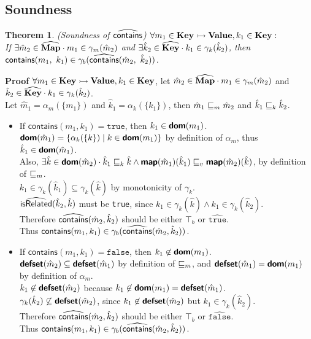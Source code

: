 \subsection{Soundness} \label{sec:soundness}
\newtheorem{thm}{Theorem}
\begin{thm} \normalfont
(\textit{Soundness of} $\widehat{\textsf{contains}}$)
$\forall m_1 \in \textbf{Key} \rightarrowtail \textbf{Value}, k_1 \in \textbf{Key} :$\\
If $\exists \hat{m}_2 \in \widehat{\textbf{Map}} \cdot m_1 \in \gamma_m(\hat{m}_2)$
and $\exists \hat{k}_2 \in \widehat{\textbf{Key}} \cdot k_1 \in \gamma_k(\hat{k}_2)$,
then $\textsf{contains}(m_1,\ k_1) \in \gamma_b(\widehat{\textsf{contains}}(\hat{m}_2,\ \hat{k}_2))$.
\end{thm}
\textbf{Proof } $\forall m_1 \in \textbf{Key} \rightarrowtail \textbf{Value}, k_1 \in \textbf{Key}$, 
let $\hat{m}_2 \in \widehat{\textbf{Map}} \cdot m_1 \in \gamma_m(\hat{m}_2)$ 
and $\hat{k}_2 \in \widehat{\textbf{Key}} \cdot k_1 \in \gamma_k(\hat{k}_2)$.\\
Let $\hat{m}_1 = \alpha_m(\{ m_1 \})$ and $\hat{k}_1 = \alpha_k(\{ k_1 \})$,
then $\hat{m}_1 \sqsubseteq_m \hat{m}_2$ and $\hat{k}_1 \sqsubseteq_k \hat{k}_2$.
\begin{itemize}
\item If $\textsf{contains}(m_1, k_1) = \texttt{true}$, then $k_1 \in \textsf{\textbf{dom}}(m_1)$.\\
$\textsf{\textbf{dom}}(\hat{m}_1)  = \{ \alpha_k(\{k\}) \mid k \in \textsf{\textbf{dom}}(m_1) \}$
by definition of $\alpha_m$, thus $\hat{k}_1 \in \textsf{\textbf{dom}}(\hat{m}_1)$.\\
Also, $\exists \hat{k} \in \textsf{\textbf{dom}}(\hat{m}_2) 
\cdot \hat{k}_1 \sqsubseteq_k \hat{k} \land \textsf{\textbf{map}}(\hat{m}_1)(\hat{k}_1) \sqsubseteq_v \textsf{\textbf{map}}(\hat{m}_2)(\hat{k})$,
by definition of $\sqsubseteq_m$.\\
$k_1 \in \gamma_k(\hat{k}_1) \subseteq \gamma_k(\hat{k})$ by monotonicity of $\gamma_k$.\\ 
$\widehat{\textsf{isRelated}}(\hat{k}_2, \hat{k})$ must be \texttt{true},
since $k_1 \in \gamma_k(\hat{k}) \land k_1 \in \gamma_k(\hat{k}_2)$. \\
Therefore $\widehat{\textsf{contains}}(\hat{m}_2, \hat{k}_2)$ should be either $\top_b$ or $\hat{\texttt{true}}$.\\
Thus $\textsf{contains}(m_1, k_1) \in \gamma_b(\widehat{\textsf{contains}}(\hat{m}_2, \hat{k}_2))$.
\item If $\textsf{contains}(m_1, k_1) = \texttt{false}$, then $k_1 \not\in \textsf{\textbf{dom}}(m_1)$.\\
$\textsf{\textbf{defset}}(\hat{m}_2) \subseteq \textsf{\textbf{defset}}(\hat{m}_1)$ by definition of $\sqsubseteq_m$,
and $\textsf{\textbf{defset}}(\hat{m}_1) = \textsf{\textbf{dom}}(m_1)$ by definition of $\alpha_m$.\\
$k_1 \not\in \textsf{\textbf{defset}}(\hat{m}_2)$ because $k_1 \not\in \textsf{\textbf{dom}}(m_1) = \textsf{\textbf{defset}}(\hat{m}_1)$. \\
$\gamma_k(\hat{k}_2) \not\subseteq \textsf{\textbf{defset}}(\hat{m}_2)$, since
$k_1 \not\in \textsf{\textbf{defset}}(\hat{m}_2)$ but $k_1 \in \gamma_k(\hat{k}_2)$.\\
Therefore $\widehat{\textsf{contains}}(\hat{m}_2, \hat{k}_2)$ should be either $\top_b$ or $\hat{\texttt{false}}$.\\
Thus $\textsf{contains}(m_1, k_1) \in \gamma_b(\widehat{\textsf{contains}}(\hat{m}_2, \hat{k}_2))$.
\end{itemize}


